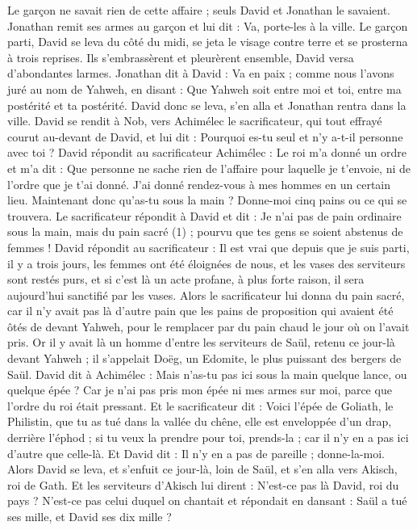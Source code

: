 \begin{multicols}{2}
Le garçon ne savait rien de cette affaire ; seuls David et Jonathan le savaient.
Jonathan remit ses armes au garçon et lui dit : Va, porte-les à la ville.
Le garçon parti, David se leva du côté du midi, se jeta le visage contre terre et se prosterna à trois reprises. Ils s’embrassèrent et pleurèrent ensemble, David versa d’abondantes larmes.
Jonathan dit à David : Va en paix ; comme nous l’avons juré au nom de Yahweh, en disant : Que Yahweh soit entre moi et toi, entre ma postérité et ta postérité.
David donc se leva, s'en alla et Jonathan rentra dans la ville.
\VerseOne{}David se rendit à Nob, vers Achimélec le sacrificateur, qui tout effrayé courut au-devant de David, et lui dit : Pourquoi es-tu seul et n'y a-t-il personne avec toi ?
David répondit au sacrificateur Achimélec : Le roi m'a donné un ordre et m'a dit : Que personne ne sache rien de l'affaire pour laquelle je t'envoie, ni de l’ordre que je t'ai donné. J’ai donné rendez-vous à mes hommes en un certain lieu.
Maintenant donc qu'as-tu sous la main ? Donne-moi cinq pains ou ce qui se trouvera.
Le sacrificateur répondit à David et dit : Je n'ai pas de pain ordinaire sous la main, mais du pain sacré (1) ; pourvu que tes gens se soient abstenus de femmes !
David répondit au sacrificateur : Il est vrai que depuis que je suis parti, il y a trois jours, les femmes ont été éloignées de nous, et les vases des serviteurs sont restés purs, et si c’est là un acte profane, à plus forte raison, il sera aujourd’hui sanctifié par les vases.
Alors le sacrificateur lui donna du pain sacré, car il n'y avait pas là d'autre pain que les pains de proposition qui avaient été ôtés de devant Yahweh, pour le remplacer par du pain chaud le jour où on l’avait pris.
Or il y avait là un homme d'entre les serviteurs de Saül, retenu ce jour-là devant Yahweh ; il s’appelait Doëg, un Edomite, le plus puissant des bergers de Saül.
David dit à Achimélec : Mais n'as-tu pas ici sous la main quelque lance, ou quelque épée ? Car je n’ai pas pris mon épée ni mes armes sur moi, parce que l’ordre du roi était pressant.
Et le sacrificateur dit : Voici l'épée de Goliath, le Philistin, que tu as tué dans la vallée du chêne, elle est enveloppée d'un drap, derrière l'éphod ; si tu veux la prendre pour toi, prends-la ; car il n'y en a pas ici d'autre que celle-là. Et David dit : Il n'y en a pas de pareille ; donne-la-moi.
Alors David se leva, et s'enfuit ce jour-là, loin de Saül, et s'en alla vers Akisch, roi de Gath.
Et les serviteurs d'Akisch lui dirent : N'est-ce pas là David, roi du pays ? N’est-ce pas celui duquel on chantait et répondait en dansant : Saül a tué ses mille, et David ses dix mille ?

\end{multicols}
